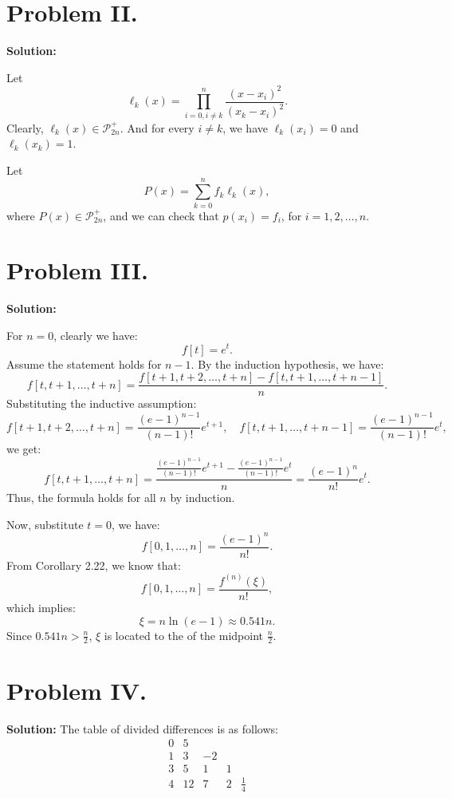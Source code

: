 \documentclass[a4paper]{article}
\renewcommand{\qed}{\hfill \boxed{\mathbb{Q.E.D.}}}
\begin{document}
\section*{Problem II.}

\textbf{Solution:}

Let 
\[
\ell_k(x) = \prod_{i=0, i \neq k}^{n} \frac{(x - x_i)^2}{(x_k - x_i)^2}.
\]
Clearly, \( \ell_k(x) \in \mathcal{P}_{2n}^+ \). And for every \( i \neq k \), we have \( \ell_k(x_i) = 0 \) and \( \ell_k(x_k) = 1 \).

Let
\[
P(x) = \sum_{k=0}^{n} f_k \ell_k(x),
\]
where \( P(x) \in \mathcal{P}_{2n}^+ \), and we can check that \( p(x_i) = f_i \), for \( i = 1, 2, \dots, n \).

\qed

\section*{Problem III.}

\textbf{Solution:}

For \( n = 0 \), clearly we have:
\[
f[t] = e^t.
\]
Assume the statement holds for \( n-1 \). By the induction hypothesis, we have:
\[
f[t, t+1, \dots, t+n] = \frac{f[t+1, t+2, \dots, t+n] - f[t, t+1, \dots, t+n-1]}{n}.
\]
Substituting the inductive assumption:
\[
f[t+1, t+2, \dots, t+n] = \frac{(e-1)^{n-1}}{(n-1)!} e^{t+1}, \quad f[t, t+1, \dots, t+n-1] = \frac{(e-1)^{n-1}}{(n-1)!} e^{t},
\]
we get:
\[
f[t, t+1, \dots, t+n] = \frac{\frac{(e-1)^{n-1}}{(n-1)!} e^{t+1} - \frac{(e-1)^{n-1}}{(n-1)!} e^t}{n} = \frac{(e-1)^n}{n!} e^t.
\]
Thus, the formula holds for all \( n \) by induction.

\qed

Now, substitute \( t = 0 \), we have:
\[
f[0, 1, \dots, n] = \frac{(e-1)^n}{n!}.
\]
From Corollary 2.22, we know that:
\[
f[0, 1, \dots, n] = \frac{f^{(n)}(\xi)}{n!},
\]
which implies:
\[
\xi = n \ln(e-1) \approx 0.541n.
\]
Since \( 0.541n > \frac{n}{2} \), \( \xi \) is located to the  of the midpoint \( \frac{n}{2} \).

\section*{Problem IV.}

\textbf{Solution:}
The table of divided differences is as follows:
\[
\begin{array}{c|cccc}
    0 & 5 &  &  &  \\
    1 & 3 & -2 &  &  \\
    3 & 5 & 1 & 1 &  \\
    4 & 12 & 7 & 2 & \frac{1}{4}
\end{array}
\]
\end{document}
